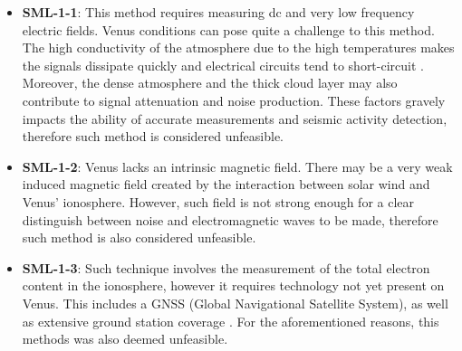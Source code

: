 \begin{itemize}
    \item \textbf{SML-1-1}: This method requires measuring dc and very low frequency electric fields. Venus conditions can pose quite a challenge to this method. The high conductivity of the atmosphere due to the high temperatures makes the signals dissipate quickly and electrical circuits tend to short-circuit \cite{SML-1-1}. Moreover, the dense atmosphere and the thick cloud layer may also contribute to signal attenuation and noise production. These factors gravely impacts the ability of accurate measurements and seismic activity detection, therefore such method is considered unfeasible. 
    \item \textbf{SML-1-2}: Venus lacks an intrinsic magnetic field. There may be a very weak induced magnetic field created by the interaction between solar wind and Venus' ionosphere. However, such field is not strong enough for a clear distinguish between noise and electromagnetic waves to be made, therefore such method is also considered unfeasible. 
    \item \textbf{SML-1-3}: Such technique involves the measurement of the total electron content in the ionosphere, however it requires technology not yet present on Venus. This includes a GNSS (Global Navigational Satellite System), as well as extensive ground station coverage \cite{SML-1-3}. For the aforementioned reasons, this methods was also deemed unfeasible.      
\end{itemize}

